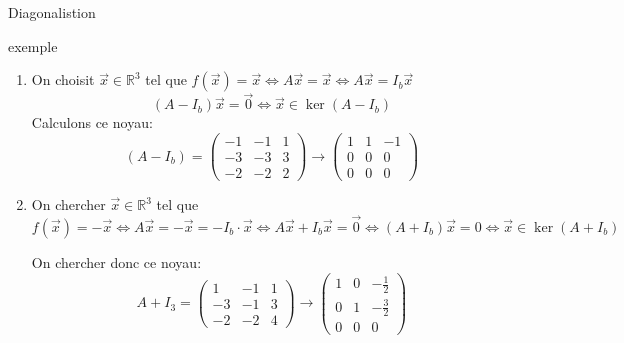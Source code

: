 \begin{parag}{Diagonalistion}
\begin{subparag}{exemple}
    \begin{enumerate}
        \item On choisit $\vec{x} \in \mathbb{R}^3$ tel que $f(\vec{x}) = \vec{x} \Leftrightarrow A\vec{x} = \vec{x} \Leftrightarrow A\vec{x} = I_b \vec{x}$
        \\
        \[(A - I_b)\vec{x} = \vec{0} \Leftrightarrow \vec{x} \in \ker (A - I_b)\]
        Calculons ce noyau:
        \[(A - I_b) = \begin{pmatrix}
            -1 & -1 & 1 \\
            -3  & -3 & 3 \\
            -2  & -2 & 2
        \end{pmatrix} \to \begin{pmatrix}
            1 & 1 & -1 \\
            0 & 0 & 0 \\
            0 & 0 & 0 
        \end{pmatrix}\]
    \item On chercher $\vec{x} \in \mathbb{R}^3$ tel que $f(\vec{x}) = -\vec{x} \Leftrightarrow A\vec{x} = -\vec{x} = -I_b\cdot\vec{x} \Leftrightarrow A\vec{x} + I_b\vec{x} = \vec{0} \Leftrightarrow (A + I_b)\vec{x} = 0 \Leftrightarrow \vec{x} \in \ker (A + I_b)$

    On chercher donc ce noyau:
\[A + I_3 = \begin{pmatrix}
    1 & -1 & 1\\
    -3 & -1 & 3\\
    -2 & -2 & 4
\end{pmatrix} \to \begin{pmatrix}
    1 & 0 & -\frac{1}{2}\\
    0 & 1 & -\frac{3}{2}\\
    0 & 0 & 0
\end{pmatrix}\]


\end{enumerate}
\end{subparag}
\end{parag}
